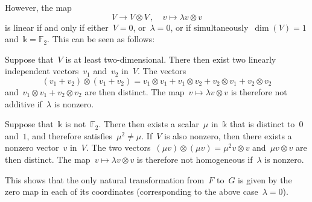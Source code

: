 However, the map
\[
	V \to V ⊗ V \,,
	\quad
	v \mapsto λ v ⊗ v
\]
is linear if and only if either~$V = 0$, or~$λ = 0$, or if simultaneously~$\dim(V) = 1$ and~$𝕜 = 𝔽_2$.
This can be seen as follows:
\begin{itemize*}

	\item
		Suppose that~$V$ is at least two-dimensional.
		There then exist two linearly independent vectors~$v_1$ and~$v_2$ in~$V$.
		The vectors
		\[
			(v_1 + v_2) ⊗ (v_1 + v_2) = v_1 ⊗ v_1 + v_1 ⊗ v_2 + v_2 ⊗ v_1 + v_2 ⊗ v_2
		\]
		and~$v_1 ⊗ v_1 + v_2 ⊗ v_2$ are then distinct.
		The map~$v \mapsto λ v ⊗ v$ is therefore not additive if~$λ$ is nonzero.

	\item
		Suppose that~$𝕜$ is not~$𝔽_2$.
		There then exists a scalar~$μ$ in~$𝕜$ that is distinct to~$0$ and~$1$, and therefore satisfies~$μ^2 ≠ μ$.
		If~$V$ is also nonzero, then there exists a nonzero vector~$v$ in~$V$.
		The two vectors~$(μ v) ⊗ (μ v) = μ^2 v ⊗ v$ and~$μ v ⊗ v$ are then distinct.
		The map~$v \mapsto λ v ⊗ v$ is therefore not homogeneous if~$λ$ is nonzero.

\end{itemize*}

This shows that the only natural transformation from~$F$ to~$G$ is given by the zero map in each of its coordinates (corresponding to the above case~$λ = 0$).

